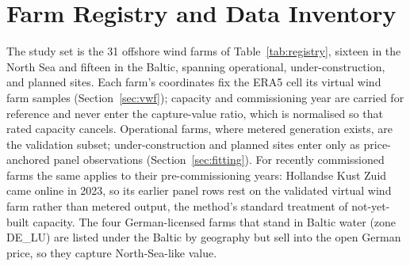 
\section{Farm Registry and Data Inventory}\label{app:registry}

The study set is the 31 offshore wind farms of Table~\ref{tab:registry}, sixteen in
the North Sea and fifteen in the Baltic, spanning operational, under-construction,
and planned sites. Each farm's coordinates fix the ERA5 cell its virtual wind farm
samples (Section~\ref{sec:vwf}); capacity and commissioning year are carried for
reference and never enter the capture-value ratio, which is normalised so that rated
capacity cancels. Operational farms, where metered generation exists, are the
validation subset; under-construction and planned sites enter only as price-anchored
panel observations (Section~\ref{sec:fitting}). For recently commissioned farms
the same applies to their pre-commissioning years: Hollandse Kust Zuid came
online in 2023, so its earlier panel rows rest on the validated virtual wind
farm rather than metered output, the method's standard treatment of
not-yet-built capacity. The four German-licensed farms that
stand in Baltic water (zone DE\_LU) are listed under the Baltic by geography but sell into the open German price, so they capture North-Sea-like value.

